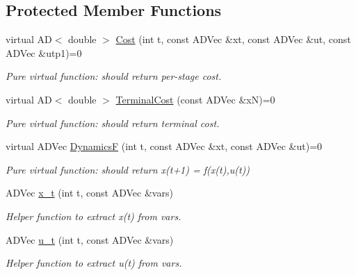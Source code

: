 \subsection*{Protected Member Functions}
\begin{DoxyCompactItemize}
\item 
virtual AD$<$ double $>$ \mbox{\hyperlink{classModel_aeae66d77dcacb0121cf68f268f1d05c7}{Cost}} (int t, const A\+D\+Vec \&xt, const A\+D\+Vec \&ut, const A\+D\+Vec \&utp1)=0
\begin{DoxyCompactList}\small\item\em Pure virtual function\+: should return per-\/stage cost. \end{DoxyCompactList}\item 
\mbox{\label{classModel_a7572e6d1528397d7caa2c55291fc7527}} 
virtual AD$<$ double $>$ \mbox{\hyperlink{classModel_a7572e6d1528397d7caa2c55291fc7527}{Terminal\+Cost}} (const A\+D\+Vec \&xN)=0
\begin{DoxyCompactList}\small\item\em Pure virtual function\+: should return terminal cost. \end{DoxyCompactList}\item 
\mbox{\label{classModel_a784c4ed8ec188f4a50094057472e2fc3}} 
virtual A\+D\+Vec \mbox{\hyperlink{classModel_a784c4ed8ec188f4a50094057472e2fc3}{DynamicsF}} (int t, const A\+D\+Vec \&xt, const A\+D\+Vec \&ut)=0
\begin{DoxyCompactList}\small\item\em Pure virtual function\+: should return x(t+1) = f(x(t),u(t)) \end{DoxyCompactList}\item 
\mbox{\label{classModel_a44419a930e8b1aa29cd9b88dcc49662c}} 
A\+D\+Vec \mbox{\hyperlink{classModel_a44419a930e8b1aa29cd9b88dcc49662c}{x\+\_\+t}} (int t, const A\+D\+Vec \&vars)
\begin{DoxyCompactList}\small\item\em Helper function to extract x(t) from vars. \end{DoxyCompactList}\item 
\mbox{\label{classModel_a406808d9be1261de0942ed4e4d794271}} 
A\+D\+Vec \mbox{\hyperlink{classModel_a406808d9be1261de0942ed4e4d794271}{u\+\_\+t}} (int t, const A\+D\+Vec \&vars)
\begin{DoxyCompactList}\small\item\em Helper function to extract u(t) from vars. \end{DoxyCompactList}\end{DoxyCompactItemize}
